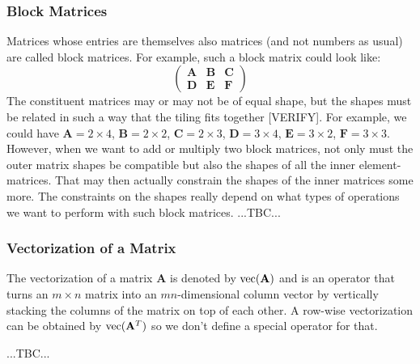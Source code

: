 \subsubsection{Block Matrices}
Matrices whose entries are themselves also matrices (and not numbers as usual) are called block matrices. For example, such a block matrix could look like:
\begin{equation}
\begin{pmatrix}
\mathbf{A} & \mathbf{B} & \mathbf{C} \\
\mathbf{D} & \mathbf{E} & \mathbf{F} 
\end{pmatrix}
\end{equation}
The constituent matrices may or may not be of equal shape, but the shapes must be related in such a way that the tiling fits together [VERIFY]. For example, we could have $\mathbf{A} = 2 \times 4$,  $\mathbf{B} = 2 \times 2$, $\mathbf{C} = 2 \times 3$, $\mathbf{D} = 3 \times 4$, $\mathbf{E} = 3 \times 2$, $\mathbf{F} = 3 \times 3$. However, when we want to add or multiply two block matrices, not only must the outer matrix shapes be compatible but also the shapes of all the inner element-matrices. That may then actually constrain the shapes of the inner matrices some more. The constraints on the shapes really depend on what types of operations we want to perform with such block matrices. ...TBC...


\subsubsection{Vectorization of a Matrix}
The vectorization of a matrix $\mathbf{A}$ is denoted by $\operatorname{vec}(\mathbf{A})$ and is an operator that turns an $m \times n$ matrix into an $mn$-dimensional column vector by vertically stacking the columns of the matrix on top of each other. A row-wise vectorization can be obtained by $\operatorname{vec}(\mathbf{A}^T)$ so we don't define a special operator for that. 



...TBC...

